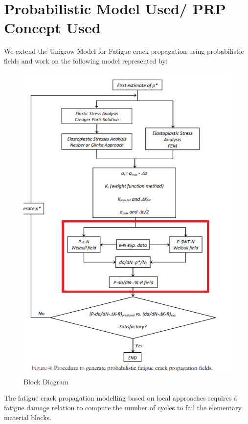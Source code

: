 \documentclass[11pt]{article}
\begin{document}
\hypertarget{probabilistic-model-used-prp-concept-used}{%
\section{Probabilistic Model Used/ PRP Concept
Used}\label{probabilistic-model-used-prp-concept-used}}

We extend the Unigrow Model for Fatigue crack propagation using
probabilistic fields and work on the following model represented by:

\begin{figure}
\centering
\includegraphics[scale=0.5]{BlockDiagram.png}
\caption{Block Diagram}
\end{figure}

The fatigue crack propagation modelling based on local approaches
requires a fatigue damage relation to compute the number of cycles to
fail the elementary material blocks.
\end{document}
